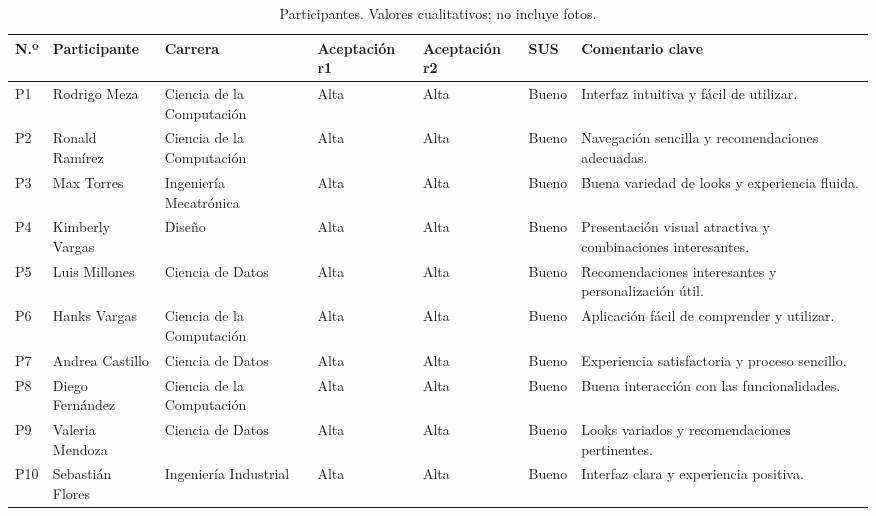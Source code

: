\documentclass[11pt,letterpaper]{article}
\begin{document}
\begin{table}[H]
\centering
\caption{Participantes. Valores cualitativos; no incluye fotos.}
\small
\begin{tabularx}{\textwidth}{@{}p{0.8cm}>{\raggedright\arraybackslash}p{2.7cm}>{\raggedright\arraybackslash}p{2.9cm}p{1.9cm}p{1.9cm}p{1.0cm}>{\raggedright\arraybackslash}L@{}}
\toprule
\textbf{N.º} & \textbf{Participante} & \textbf{Carrera} & \textbf{Aceptación r1} & \textbf{Aceptación r2} & \textbf{SUS} & \textbf{Comentario clave} \\
\midrule
P1 & Rodrigo Meza & Ciencia de la Computación & Alta & Alta & Bueno & Interfaz intuitiva y fácil de utilizar. \\
P2 & Ronald Ramírez & Ciencia de la Computación & Alta & Alta & Bueno & Navegación sencilla y recomendaciones adecuadas. \\
P3 & Max Torres & Ingeniería Mecatrónica & Alta & Alta & Bueno & Buena variedad de looks y experiencia fluida. \\
P4 & Kimberly Vargas & Diseño & Alta & Alta & Bueno & Presentación visual atractiva y combinaciones interesantes. \\
P5 & Luis Millones & Ciencia de Datos & Alta & Alta & Bueno & Recomendaciones interesantes y personalización útil. \\
P6 & Hanks Vargas & Ciencia de la Computación & Alta & Alta & Bueno & Aplicación fácil de comprender y utilizar. \\
P7 & Andrea Castillo & Ciencia de Datos & Alta & Alta & Bueno & Experiencia satisfactoria y proceso sencillo. \\
P8 & Diego Fernández & Ciencia de la Computación & Alta & Alta & Bueno & Buena interacción con las funcionalidades. \\
P9 & Valeria Mendoza & Ciencia de Datos & Alta & Alta & Bueno & Looks variados y recomendaciones pertinentes. \\
P10 & Sebastián Flores & Ingeniería Industrial & Alta & Alta & Bueno & Interfaz clara y experiencia positiva. \\
\bottomrule
\end{tabularx}
\end{table}
\end{document}
